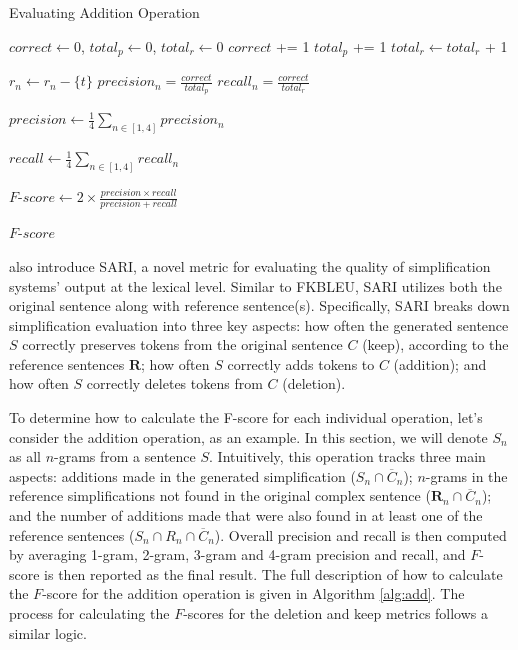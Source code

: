 \documentclass[thesis.tex]{subfiles}
\begin{document}
\begin{algorithm}
\caption{Evaluating Addition Operation}
\label{alg:add}

\begin{algorithmic}[1]
    \State $correct \gets 0$, $total_p \gets 0$, $total_r \gets 0$
            \State $correct$ += 1
        \EndIf
         \State $total_p$ += 1
        \EndIf
            \State $total_r \gets total_r$ + 1
        \EndIf
        
            \State $r_n \gets r_n - \{t\}$
        \EndFor
    \EndFor
    \State $precision_n = \frac{correct}{total_p}$
    \State $recall_n = \frac{correct}{total_r}$
\EndFor

\State $precision \gets \frac{1}{4} \sum_{n \in [1, 4]}precision_n$

\State $recall \gets \frac{1}{4} \sum_{n \in [1, 4]}recall_n$

\State $F$-$score \gets 2 \times \frac{precision \times recall}{precision + recall}$

\Return $F$-$score$

\EndProcedure
\end{algorithmic}
\end{algorithm}

\cite{xu2016optimizing} also introduce SARI, a novel metric for evaluating the quality of simplification systems' output at the lexical level. Similar to FKBLEU, SARI utilizes both the original sentence along with reference sentence(s). Specifically, SARI breaks down simplification evaluation into three key aspects: how often the generated sentence $S$ correctly preserves tokens from the original sentence $C$ (keep), according to the reference sentences $\mathbf{R}$; how often $S$ correctly adds tokens to $C$ (addition); and how often $S$ correctly deletes tokens from $C$ (deletion).

To determine how to calculate the F-score for each individual operation, let's consider the addition operation, as an example. In this section, we will denote $S_n$ as all $n$-grams from a sentence $S$. Intuitively, this operation tracks three main aspects: additions made in the generated simplification ($S_n \cap \overline{C}_n$); $n$-grams in the reference simplifications not found in the original complex sentence ($\mathbf{R}_n \cap \overline{C}_n$); and the number of additions made that were also found in at least one of the reference sentences ($S_n \cap R_n \cap \overline{C}_n$). Overall precision and recall is then computed by averaging 1-gram, 2-gram, 3-gram and 4-gram precision and recall, and $F$-score is then reported as the final result. The full description of how to calculate the $F$-score for the addition operation is given in Algorithm \ref{alg:add}. The process for calculating the $F$-scores for the deletion and keep metrics follows a similar logic.
\end{document}

